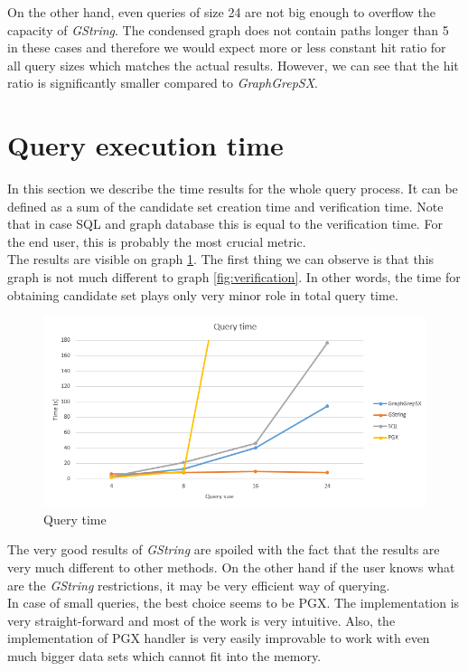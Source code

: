 On the other hand, even queries of size 24 are not big enough to overflow the capacity of \textit{GString}. The condensed graph does not contain paths longer than 5 in these cases and therefore we would expect more or less constant hit ratio for all query sizes which matches the actual results. However, we can see that the hit ratio is significantly smaller compared to \textit{GraphGrepSX}.

\section{Query execution time}
In this section we describe the time results for the whole query process. It can be defined as a sum of the candidate set creation time and verification time. Note that in case SQL and graph database this is equal to the verification time. For the end user, this is probably the most crucial metric.\\

The results are visible on graph \ref{fig:querytime}. The first thing we can observe is that this graph is not much different to graph \ref{fig:verification}. In other words, the time for obtaining candidate set plays only very minor role in total query time.\\

\begin{figure}[h]
	\centering
	\includegraphics[width=1\textwidth]{../img/queryTime.png}
	\caption{Query time}
	\label{fig:querytime}
\end{figure}

The very good results of \textit{GString} are spoiled with the fact that the results are very much different to other methods. On the other hand if the user knows what are the \textit{GString} restrictions, it may be very efficient way of querying.\\

In case of small queries, the best choice seems to be PGX. The implementation is very straight-forward and most of the work is very intuitive. Also, the implementation of PGX handler is very easily improvable to work with even much bigger data sets which cannot fit into the memory.\\

